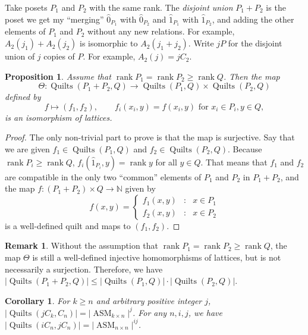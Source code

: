 \documentclass[12pt]{amsart}
\numberwithin{equation}{section}
\newtheorem{prop}[theorem]{Proposition}
\newtheorem{cor}[theorem]{Corollary}
\theoremstyle{definition}
\newtheorem{remark}[theorem]{Remark}
\newcommand{\longto}{\longrightarrow}
\newcommand{\ASM}{\operatorname{ASM}}
\newcommand{\quilt}{\operatorname{Quilts}}
\newcommand{\rank}{\operatorname{rank}}
\begin{document}
Take posets $P_1$ and $P_2$ with the same rank. The \emph{disjoint union} $P_1 + P_2$ is the poset we get my ``merging'' $\hat 0_{P_1}$ with $\hat 0_{P_2}$ and $\hat 1_{P_1}$ with $\hat 1_{P_2}$, and adding the other elements of $P_1$ and $P_2$ without any new relations. For example, $A_2(j_1) + A_2(j_2)$ is isomorphic to $A_2(j_1 + j_2)$. Write $j P$ for the disjoint union of $j$ copies of $P$. For example, $A_2(j) = j C_2$.

\begin{prop}
 Assume that $\rank P_1 = \rank P_2 \geq \rank Q$. Then the map
 $$\Theta \colon \quilt(P_1 + P_2, Q) \longto \quilt(P_1, Q) \times \quilt(P_2, Q)$$
 defined by
 $$f \mapsto (f_1,f_2), \qquad f_i(x_i,y) = f(x_i,y) \text{ for } x_i \in P_i, y \in Q,$$
 is an isomorphism of lattices.
\end{prop}
\begin{proof}
  The only non-trivial part to prove is that the map is
  surjective. Say that we are given $f_1 \in \quilt(P_1,Q)$ and $f_2
  \in \quilt(P_2,Q)$. Because $\rank P_i \geq \rank Q$, $f_i(\hat
  1_{P_i},y) = \rank y$ for all $y \in Q$. That means that $f_1$ and
  $f_2$ are compatible in the only two ``common'' elements of $P_1$
  and $P_2$ in $P_1+P_2$, and the map $f:(P_1 + P_2)\times  Q
  \longrightarrow \mathbb{N}$ given by
  $$f(x,y) = \left\{ \begin{array}{ccl} f_1(x,y) & : & x \in P_1 \\ f_2(x,y) & : & x \in P_2 \end{array} \right.$$
  is a well-defined quilt and maps to $(f_1,f_2)$.
\end{proof}

\begin{remark}\label{rem:sums}
Without the assumption that $\rank P_1 = \rank P_2 \geq \rank Q$, the
map $\Theta$ is still a well-defined injective homomorphisms of
lattices, but is not necessarily a surjection. Therefore, we have
$|\quilt(P_1 + P_2, Q)| \leq |\quilt(P_1, Q)| \cdot |\quilt(P_2, Q)|$.
\end{remark}


\begin{cor} \label{cor:powerofasm}
 For $k \geq n$ and arbitrary positive integer $j$, $|\quilt(j C_k,
C_n)| = |\ASM_{k \times n}|^{j}$. For any $n,i,j$, we have $|\quilt(i
C_n, j C_n)| = |\ASM_{n \times n}|^{ij}$.
\end{cor}
\end{document}
